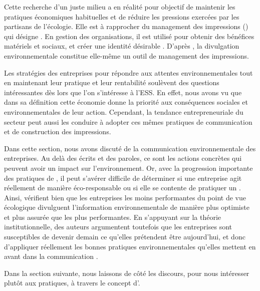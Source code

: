             Cette recherche d'un juste milieu a en réalité pour objectif de maintenir les pratiques économiques habituelles et de réduire les pressions exercées par les partisans de l'écologie. Elle est à rapprocher du management des impressions () \parencite{cho2010language, frandsen2011rhetoric, higgins2012ethos} qui désigne  \parencite[][p.34]{leary1990impression}. En gestion des organisations, il est utilisé pour obtenir des bénéfices matériels et sociaux, et créer une identité désirable \parencite{merkl-davies2007discretionary}. D'après \textcite{cho2010language}, la divulgation environnementale constitue elle-même un outil de management des impressions.

            \transition

            Les stratégies des entreprises pour répondre aux attentes environnementales tout en maintenant leur pratique et leur rentabilité soulèvent des questions intéressantes dès lors que l'on s'intéresse à l'ESS. En effet, nous avons vu que dans sa définition cette économie donne la priorité aux conséquences sociales et environnementales de leur action. Cependant, la tendance entrepreneuriale du secteur peut aussi les conduire à adopter ces mêmes pratiques de communication et de construction des impressions.


\transition

    Dans cette section, nous avons discuté de la communication environnementale des entreprises. Au delà des écrits et des paroles, ce sont les actions concrètes qui peuvent avoir un impact sur l'environnement. Or, avec la progression importante des pratiques de \rse, il peut s'avérer difficile de déterminer si une entreprise agit réellement de manière éco-responsable ou si elle se contente de pratiquer un  \parencite{parguel2011how}. Ainsi, \textcite{cho2010language} vérifient bien que les entreprises les moins performantes du point de vue écologique divulguent l'information environnementale de manière plus optimiste et plus assurée que les plus performantes. En s'appuyant sur la théorie institutionnelle, des auteurs argumentent toutefois que les entreprises sont susceptibles de devenir demain ce qu'elles prétendent être aujourd'hui, et donc d'appliquer réellement les bonnes pratiques environnementales qu'elles mettent en avant dans la communication \parencite{frandsen2011rhetoric}.

    Dans la section suivante, nous laissons de côté les discours, pour nous intéresser plutôt aux pratiques, à travers le concept d'\ei.


